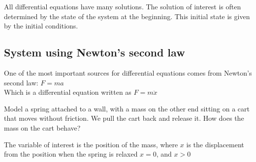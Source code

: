 \documentclass[11pt, openright]{book}
\begin{document}
All differential equations have many solutions. The solution of interest is often determined by the state of the system at the beginning. This initial state is given by the initial conditions.

\subsection{System using Newton's second law}


One of the most important sources for differential equations comes from Newton's second law: $\boxed{F=ma}$\\
Which is a differential equation written as $F=m\ddot{x}$

\begin{dent}{}
    Model a spring attached to a wall, with a mass on the other end sitting on a cart that moves without friction. We pull the cart back and release it. How does the mass on the cart behave?

    The variable of interest is the position of the mass, where $x$ is the displacement from the position when the spring is relaxed $x=0$, and $x>0$

    \begin{figure}[!htb]
        \begin{floatrow}


            \hspace{1.25cm}


\end{floatrow}
\end{figure}
\end{dent}
\end{document}
